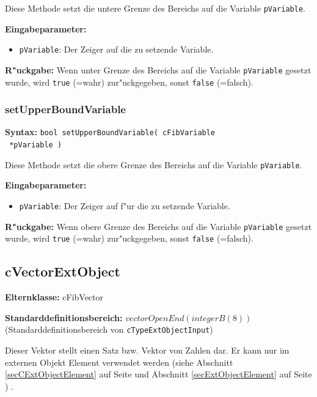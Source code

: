 \bigskip\noindent
Diese Methode setzt die untere Grenze des Bereichs auf die Variable \verb|pVariable|.

\bigskip\noindent
\textbf{Eingabeparameter:}
\begin{itemize}
 \item \verb|pVariable|: Der Zeiger auf die zu setzende Variable.
\end{itemize}

\bigskip\noindent
\textbf{R"uckgabe:} Wenn unter Grenze des Bereichs auf die Variable \verb|pVariable| gesetzt wurde, wird \verb|true| (=wahr) zur"uckgegeben, sonst \verb|false| (=falsch).


\subsubsection{setUpperBoundVariable}

\textbf{Syntax:} \verb|bool setUpperBoundVariable( cFibVariable| \\\verb| *pVariable )|

\bigskip\noindent
Diese Methode setzt die obere Grenze des Bereichs auf die Variable \verb|pVariable|.

\bigskip\noindent
\textbf{Eingabeparameter:}
\begin{itemize}
 \item \verb|pVariable|: Der Zeiger auf f"ur die zu setzende Variable.
\end{itemize}

\bigskip\noindent
\textbf{R"uckgabe:} Wenn obere Grenze des Bereichs auf die Variable \verb|pVariable| gesetzt wurde, wird \verb|true| (=wahr) zur"uckgegeben, sonst \verb|false| (=falsch).


\subsection{cVectorExtObject}

\bigskip\noindent
\textbf{Elternklasse:} cFibVector

\bigskip\noindent
\textbf{Standarddefinitionsbereich:} $vectorOpenEnd( integerB(8) )$ (Standarddefinitionsbereich von \verb|cTypeExtObjectInput|)

\bigskip\noindent
Dieser Vektor stellt einen Satz bzw. Vektor von Zahlen dar. Er kann nur im externen Objekt Element verwendet werden (siehe Abschnitt \ref{secCExtObjectElement} auf Seite \pageref{secCExtObjectElement} und Abschnitt \ref{secExtObjectElement} auf Seite \pageref{secExtObjectElement} ) .


